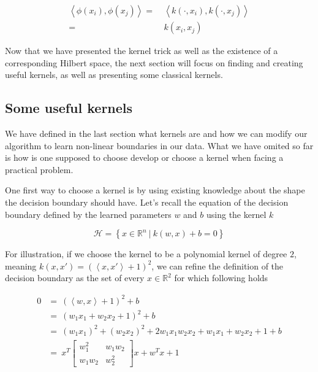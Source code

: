 \begin{equation*}
  \begin{aligned}
    \left<\phi(x_i), \phi(x_j)\right> =\ &\left<k\left(\cdot, x_i\right), k\left(\cdot, x_j\right)\right>\\
    =\ &k(x_i, x_j)
  \end{aligned}
\end{equation*}

Now that we have presented the kernel trick as well as the existence of a corresponding Hilbert space, the next section will focus on finding and creating useful kernels, as well as presenting some classical kernels.

\subsection {Some useful kernels}

We have defined in the last section what kernels are and how we can modify our algorithm to learn non-linear boundaries in our data. What we have omited so far is how is one supposed to choose develop or choose a kernel when facing a practical problem.

One first way to choose a kernel is by using existing knowledge about the shape the decision boundary should have. Let's recall the equation of the decision boundary defined by the learned parameters $w$ and $b$ using the kernel $k$

\begin{equation*}
  \mathscr{H} = \left\{x \in \mathbb{R}^n\ |\ k\left(w, x\right) + b = 0\right\}
\end{equation*}

For illustration, if we choose the kernel to be a polynomial kernel of degree $2$, meaning $k\left(x, x'\right) = \left(\left<x, x'\right> + 1\right)^2$, we can refine the definition of the decision boundary as the set of every $x \in \mathbb{R}^2$ for which following holds

\begin{equation*}
  \begin{aligned}
    0 &=\ \left(\left<w, x\right> + 1\right)^2 + b\\
      &=\ \left(w_1x_1 + w_2x_2 + 1\right)^2 + b\\
      &=\ (w_1x_1)^2 + (w_2x_2)^2 + 2w_1x_1w_2x_2 + w_1x_1 + w_2x_2 + 1 + b\\
      &=\ x^T\begin{bmatrix}w_1^2 & w_1w_2\\ w_1w_2 & w_2^2\end{bmatrix}x +
    w^Tx + 1 
  \end{aligned}
\end{equation*}

